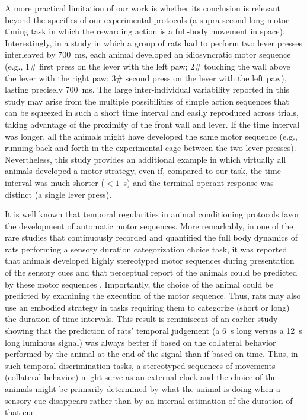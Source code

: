 A more practical limitation of our work is whether its conclusion is relevant beyond the specifics of our experimental protocols (a supra-second long motor timing task in which the rewarding action is a full-body movement in space).
Interestingly, in a study in which a group of rats had to perform two lever presses interleaved by 700~ms, each animal developed an idiosyncratic motor sequence (e.g., 1\# first press on the lever with the left paw; 2\# touching the wall above the lever with the right paw; 3\# second press on the lever with the left paw), lasting precisely 700~ms\cite{Kawai2015Neuron}.
The large inter-individual variability reported in this study may arise from the multiple possibilities of simple action sequences that can be squeezed in such a short time interval and easily reproduced across trials, taking advantage of the proximity of the front wall and lever.
If the time interval was longer, all the animals might have developed the same motor sequence (e.g., running back and forth in the experimental cage between the two lever presses).
Nevertheless, this study provides an additional example in which virtually all animals developed a motor strategy, even if, compared to our task, the time interval was much shorter ($< 1$~s) and the terminal operant response was distinct (a single lever press).
\par
It is well known that temporal regularities in animal conditioning protocols favor the development of automatic motor sequences.
More remarkably, in one of the rare studies that continuously recorded and quantified the full body dynamics of rats performing a sensory duration categorization choice task, it was reported that animals developed highly stereotyped motor sequences during presentation of the sensory cues and that perceptual report of the animals could be predicted by these motor sequences \cite{Gouvea2014FrontNeurorobotics}.
Importantly, the choice of the animal could be predicted by examining the execution of the motor sequence.
Thus, rats may also use an embodied strategy in tasks requiring them to categorize (short or long) the duration of time intervals.
This result is reminiscent of an earlier study showing that the prediction of rats' temporal judgement (a 6~s long versus a 12~s long luminous signal) was always better if based on the collateral behavior performed by the animal at the end of the signal than if based on time\cite{Fetterman1998}.
Thus, in such temporal discrimination tasks, a stereotyped sequences of movements (collateral behavior) might serve as an external clock and the choice of the animals might be primarily determined by what the animal is doing when a sensory cue disappears rather than by an internal estimation of the duration of that cue.
